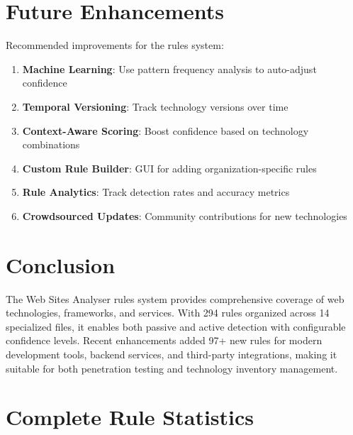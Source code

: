 \documentclass[11pt,a4paper,oneside]{article}
\begin{document}
\section{Future Enhancements}

Recommended improvements for the rules system:

\begin{enumerate}
    \item \textbf{Machine Learning}: Use pattern frequency analysis to auto-adjust confidence
    \item \textbf{Temporal Versioning}: Track technology versions over time
    \item \textbf{Context-Aware Scoring}: Boost confidence based on technology combinations
    \item \textbf{Custom Rule Builder}: GUI for adding organization-specific rules
    \item \textbf{Rule Analytics}: Track detection rates and accuracy metrics
    \item \textbf{Crowdsourced Updates}: Community contributions for new technologies
\end{enumerate}

\section{Conclusion}

The Web Sites Analyser rules system provides comprehensive coverage of web technologies, frameworks, and services. With 294 rules organized across 14 specialized files, it enables both passive and active detection with configurable confidence levels. Recent enhancements added 97+ new rules for modern development tools, backend services, and third-party integrations, making it suitable for both penetration testing and technology inventory management.

\appendix

\section{Complete Rule Statistics}
\end{document}
